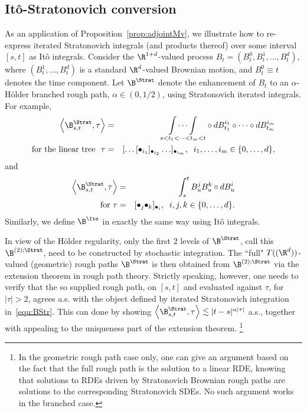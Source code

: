 \documentclass{article}
\begin{document}
\subsection{It\^{o}-Stratonovich conversion}\label{subsec:ItoStrat}

As an application of Proposition~\ref{prop:adjointMv}, we illustrate how to re-express iterated Stratonovich integrals (and products thereof) over some interval $\left[s,t \right] $ as It{\^o} integrals. Consider the $\R^{1+d}$-valued process $B_t = (B^0_t, B^1_t, \ldots, B^d_t)$, where $(B^1_t, \ldots, B^d_t)$ is a standard $\R^d$-valued Brownian motion, and $B^0_t \equiv t$ denotes the time component. Let $\B^{\Strat}$ denote the enhancement of $B_t$ to an $\alpha$-H{\"o}lder branched rough path, $\alpha \in (0,1/2)$, using Stratonovich iterated integrals. For example,  
\begin{eqnarray}
\left\langle \B^\Strat_{s,t},\tau \right\rangle  &=&\underset{%
s<t_{1}<\dots <t_{m}<t}{\int \cdots \int }\circ dB_{t_{1}}^{i_{1}}\circ
\dots \circ dB_{t_{m}}^{i_{m}}   \label{equ:BStr}   \\  
\text{for the linear tree \ }\tau  &=& [\ldots [\bullet_{i_1}]_{\bullet_{i_2}} \ldots ]_{\bullet_{i_m}}, \; \; i_1,\ldots,i_m \in \{0,\ldots, d\},   \nonumber
\end{eqnarray}%
and
\begin{eqnarray*}
\left\langle \B^\Strat_{s,t},\tau \right\rangle 
&=&\int_{s}^{t}B_{u}^{j}B_{u}^{k}\circ dB_{u}^{i} \\
\text{for }\tau  &=&[\bullet_j \bullet_k]_{\bullet_i}, \; \; i,j,k \in \{0,\ldots, d\}.
\end{eqnarray*}%
Similarly, we define $\B^\Ito$ in exactly the same way using It\^{o} integrals.

\begin{remark} In view of the H\"older regularity, only the first $2$ levels of $\B^\Strat$, call this $\B^{(2);\Strat}$, need to be constructed by stochastic integration. The ``full" $T((\R^d))$-valued (geometric) rough paths $\B^\Strat$ is then obtained from $\B^{(2);\Strat}$ via the extension theorem in rough path theory. Strictly speaking, however, one needs to verify that the so supplied rough path, on $[s,t]$ and evaluated against $\tau$, for $|\tau|>2$, agrees a.s. with the object defined by iterated Stratonovich integration in~\eqref{equ:BStr}. This can done by showing $\left\langle \B^\Strat_{s,t},\tau \right\rangle \lesssim |t-s|^{\alpha | \tau |}$ a.s., together with appealing to the uniqueness part of the extension theorem. \footnote{In the geometric rough path case only, one can give an argument based on the fact that the full rough path is the solution to a linear RDE, knowing that solutions to RDEs driven by Stratonovich Brownian rough paths are solutions to the corresponding Stratonovich SDEs. No such argument works in the branched case.}
\end{remark}
\end{document}
